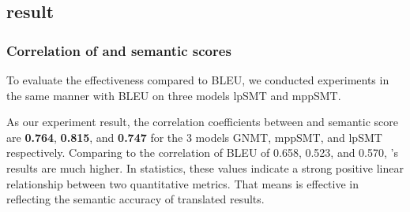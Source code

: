 \subsection{{\model} result}
\subsubsection{Correlation of {\model} and semantic scores}
To evaluate the effectiveness {\model} compared to BLEU, we conducted experiments 
in the same manner with BLEU on three models lpSMT and mppSMT. 

%

As our experiment result, the correlation coefficients between {\model} and
semantic score are \textbf{0.764}, \textbf{0.815}, and \textbf{0.747} for the 
3 models GNMT, mppSMT, and lpSMT  respectively. Comparing to the correlation 
of BLEU of 0.658, 0.523, and 0.570, {\model}'s results are much higher. 
In statistics, these values indicate a strong positive linear relationship between two 
quantitative metrics. That means {\model} is effective in reflecting the 
semantic accuracy of translated results.



